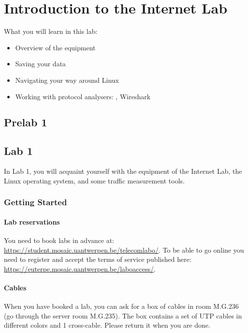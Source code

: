 
\chapter{Introduction to the Internet Lab}

What you will learn in this lab:
\begin{itemize}
	\item Overview of the equipment
	\item Saving your data
	\item Navigating your way around Linux
	\item Working with protocol analysers: , Wireshark
\end{itemize}

\newpage
{}
\section{Prelab 1}\label{sec:prelab1}


\newpage
{}
\section{Lab 1}\label{sec:lab1}

In Lab 1, you will acquaint yourself with the equipment of the Internet Lab, the Linux operating system, and some traffic measurement tools.

\newpage
\subsection{Getting Started}
\subsubsection*{Lab reservations}

You need to book labs in advance at: \url{https://student.mosaic.uantwerpen.be/telecomlabo/}. To be able to go online you need to register and accept the terms of service published here: \url{https://euterpe.mosaic.uantwerpen.be/laboaccess/}.

\subsubsection*{Cables}

When you have booked a lab, you can ask for a box of cables in room M.G.236 (go through the server room M.G.235). The box contains a set of UTP cables in different colors and 1 cross-cable. Please return it when you are done.

